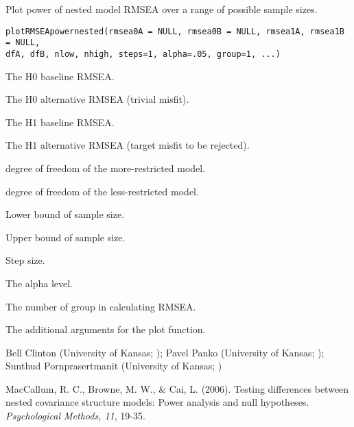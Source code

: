 \documentclass[a4paper]{book}
\begin{document}
%
\begin{Description}\relax
Plot power of nested model RMSEA over a range of possible sample sizes.
\end{Description}
%
\begin{Usage}
\begin{verbatim}
plotRMSEApowernested(rmsea0A = NULL, rmsea0B = NULL, rmsea1A, rmsea1B = NULL, 
dfA, dfB, nlow, nhigh, steps=1, alpha=.05, group=1, ...)
\end{verbatim}
\end{Usage}
%
\begin{Arguments}
\begin{ldescription}
\item[\code{rmsea0A}] The H0 baseline RMSEA.
\item[\code{rmsea0B}] The H0 alternative RMSEA (trivial misfit).
\item[\code{rmsea1A}] The H1 baseline RMSEA.
\item[\code{rmsea1B}] The H1 alternative RMSEA (target misfit to be rejected).
\item[\code{dfA}] degree of freedom of the more-restricted model.
\item[\code{dfB}] degree of freedom of the less-restricted model.
\item[\code{nlow}] Lower bound of sample size.
\item[\code{nhigh}] Upper bound of sample size.
\item[\code{steps}] Step size.
\item[\code{alpha}] The alpha level.
\item[\code{group}] The number of group in calculating RMSEA.
\item[\code{...}] The additional arguments for the plot function.
\end{ldescription}
\end{Arguments}
%
\begin{Author}\relax
Bell Clinton (University of Kansas; ); Pavel Panko (University of Kansas; ); Sunthud Pornprasertmanit (University of Kansas; )
\end{Author}
%
\begin{References}\relax
MacCallum, R. C., Browne, M. W., \& Cai, L. (2006). Testing differences between nested covariance structure models: Power analysis and null hypotheses. \emph{Psychological Methods, 11}, 19-35.
\end{References}
\end{document}
